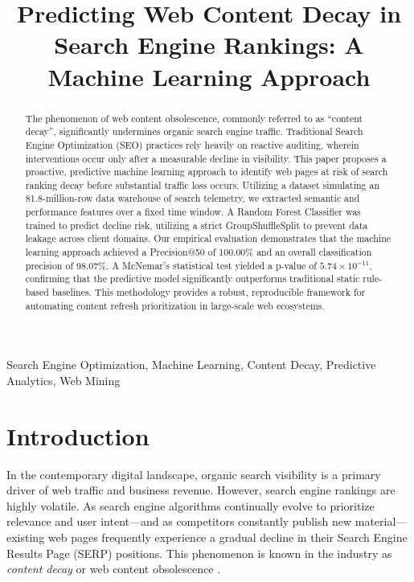 \documentclass[conference]{IEEEtran}
\begin{document}
\title{Predicting Web Content Decay in Search Engine Rankings: A Machine Learning Approach\\
}

\author{
}

\maketitle

\begin{abstract}
The phenomenon of web content obsolescence, commonly referred to as ``content decay'', significantly undermines organic search engine traffic. Traditional Search Engine Optimization (SEO) practices rely heavily on reactive auditing, wherein interventions occur only after a measurable decline in visibility. This paper proposes a proactive, predictive machine learning approach to identify web pages at risk of search ranking decay before substantial traffic loss occurs. Utilizing a dataset simulating an 81.8-million-row data warehouse of search telemetry, we extracted semantic and performance features over a fixed time window. A Random Forest Classifier was trained to predict decline risk, utilizing a strict GroupShuffleSplit to prevent data leakage across client domains. Our empirical evaluation demonstrates that the machine learning approach achieved a Precision@50 of 100.00\% and an overall classification precision of 98.07\%. A McNemar's statistical test yielded a p-value of $5.74 \times 10^{-11}$, confirming that the predictive model significantly outperforms traditional static rule-based baselines. This methodology provides a robust, reproducible framework for automating content refresh prioritization in large-scale web ecosystems.
\end{abstract}

\begin{IEEEkeywords}
Search Engine Optimization, Machine Learning, Content Decay, Predictive Analytics, Web Mining
\end{IEEEkeywords}

\section{Introduction}
In the contemporary digital landscape, organic search visibility is a primary driver of web traffic and business revenue. However, search engine rankings are highly volatile. As search engine algorithms continually evolve to prioritize relevance and user intent—and as competitors constantly publish new material—existing web pages frequently experience a gradual decline in their Search Engine Results Page (SERP) positions. This phenomenon is known in the industry as \textit{content decay} or web content obsolescence \cite{lewandowski2021seo}. 
\end{document}
